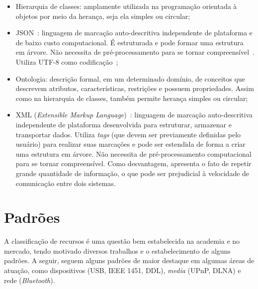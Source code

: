 \begin{itemize}
	\item Hierarquia de classes: amplamente utilizada na programação orientada à objetos por meio da herança, seja ela simples ou circular;

	\item JSON~\cite{json}: linguagem de marcação auto-descritiva independente de plataforma e de baixo custo computacional. É estruturada e pode formar uma estrutura em árvore. Não necessita de pré-processamento para se tornar compreensível~\cite{comparativojson}. Utiliza UTF-8 como codificação~\cite{utf8};
	
	\item Ontologia: descrição formal, em um determinado domínio, de conceitos que descrevem atributos, características, restrições e possuem propriedades. Assim como na hierarquia de classes, também permite herança simples ou circular;

	\item XML (\emph{Extensible Markup Language})~\cite{xml}: linguagem de marcação auto-descritiva independente de plataforma desenvolvida para estruturar, armazenar e transportar dados. Utiliza \emph{tags} (que devem ser previamente definidas pelo usuário) para realizar suas marcações e pode ser estendida de forma a criar uma estrutura em árvore. Não necessita de pré-processamento computacional para se tornar compreensível. Como desvantagem, apresenta o fato de repetir grande quantidade de informação, o que pode ser prejudicial à velocidade de comunicação entre dois sistemas.
\end{itemize}

\section{Padrões}

A classificação de recursos é uma questão bem estabelecida na academia e no mercado, tendo motivado diversos trabalhos e o estabelecimento de alguns padrões. A seguir, seguem alguns padrões de maior destaque em algumas áreas de atuação, como dispositivos (USB, IEEE 1451, DDL), \emph{media} (UPnP, DLNA) e rede (\emph{Bluetooth}).








